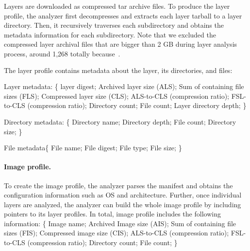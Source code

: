 Layers are downloaded as compressed tar archive files.
%
To produce the layer profile, the analyzer first decompresses and extracts each
layer tarball to a layer directory.
%
Then, it recursively traverses each subdirectory and obtains
the metadata information for each subdirectory. Note that we excluded the compressed layer archival files that are bigger than 2 GB during layer analysis process, around 1,268 totally because~.

The layer profile contains metadata about the layer, its directories,
and files: 

Layer metadata: \{
layer digest; 
Archived layer size (ALS); 
Sum of containing file sizes (FLS); 
Compressed layer size (CLS); 
ALS-to-CLS (compression ratio);
FSL-to-CLS (compression ratio);
Directory count;
File count;
Layer directory depth;
\}

Directory metadata: \{
Directory name;
Directory depth;
File count;
Directory size;
\}

File metadata\{
File name;
File digest;
File type;
File size;
\}


\paragraph{Image profile.}

To create the image profile, the analyzer parses the manifest
and obtains the configuration information such as OS and architecture.
Further, once individual layers are analyzed, the analyzer can build the whole image
profile by including pointers to its layer profiles. In total, image profile includes
the following information:
\{
Image name; 
Archived Image size (AIS); 
Sum of containing file sizes (FIS); 
Compressed image size (CIS); 
ALS-to-CLS (compression ratio);
FSL-to-CLS (compression ratio);
Directory count;
File count;
\}

